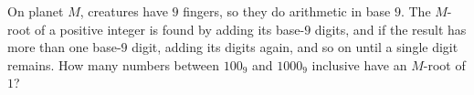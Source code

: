 On planet $M$, creatures have $9$ fingers, so they do arithmetic in base $9$. The $M$-root of a positive integer is found by adding its base-$9$ digits, and if the result has more than one base-$9$ digit, adding its digits again, and so on until a single digit remains. How many numbers between $100_9$ and $1000_9$ inclusive have an $M$-root of $1$?
